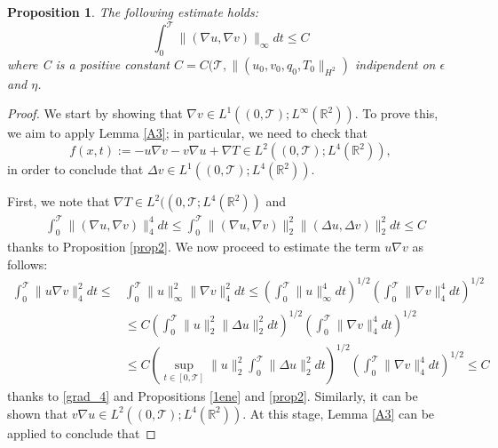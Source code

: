 \documentclass[11pt, a4paper, article,reqno,]{amsart}
\newtheorem{proposition}[theorem]{Proposition}
\theoremstyle{remark}
\numberwithin{equation}{section}
\begin{document}
\begin{proposition}\label{grad_infty}
     The following estimate holds:
    \begin{equation}\label{grad_inf}
        \int_0^\mathcal{T}\|(\nabla u, \nabla v)\|_\infty dt \leq C 
    \end{equation}
    where C is a positive constant $C= C(\mathcal{T},\|(u_0,v_0,q_0,T_{0}\|_{H^2})$ indipendent on $\epsilon$ and $\eta$.
\end{proposition}
\begin{proof}
    We start by showing that $\nabla v \in L^1((0,\mathcal{T}); L^\infty(\mathbb{R}^2))$. To prove this, we aim to apply Lemma \ref{A3}; in particular, we need to check that
\begin{equation*}
    f(x,t) := - u \nabla v - v \nabla u + \nabla T \in L^2((0,\mathcal{T}); L^4(\mathbb{R}^2)),
\end{equation*}
in order to conclude that $\Delta v \in L^1((0,\mathcal{T}); L^4(\mathbb{R}^2))$.

    First, we note that $\nabla T \in L^2((0,\mathcal{T}; L^4(\mathbb{R}^2))$ and 
    \begin{equation}\label{grad_4}
        \begin{aligned}
            & \int_0^\mathcal{T} \|(\nabla u,\nabla v)\|_4^4 dt \leq \int_0^\mathcal{T}\|(\nabla u, \nabla v)\|_2^2 \|(\Delta u, \Delta v)\|_2^2 dt \leq C
        \end{aligned}
    \end{equation}
    thanks to Proposition \ref{prop2}. We now proceed to estimate the term $u \nabla v$ as follows:
\begin{equation*}
\begin{aligned}
   \int_0^\mathcal{T}\|u \nabla v\|_4^2 dt \leq & \int_0^\mathcal{T}\|u\|_\infty^2 \|\nabla v\|_4^2 dt \leq \left( \int_0^\mathcal{T}\|u\|_\infty^4 dt\right)^{1/2} \left( \int_0^\mathcal{T}\|\nabla v\|_4^4 dt\right)^{1/2} \\
   & \leq C\left( \int_0^\mathcal{T}\|u\|_2^2 \|\Delta u\|_2^2 dt\right)^{1/2} \left( \int_0^\mathcal{T}\|\nabla v\|_4^4 dt\right)^{1/2} \\
   & \leq C \left( \sup_{t \in [0,\mathcal{T}]} \|u\|_2^2\int_0^\mathcal{T}\|\Delta u\|_2^2 dt\right)^{1/2} \left( \int_0^\mathcal{T}\|\nabla v\|_4^4 dt\right)^{1/2} \leq C
\end{aligned}
\end{equation*}
thanks to \eqref{grad_4} and Propositions \ref{1ene} and \ref{prop2}. Similarly, it can be shown that $v \nabla u \in L^2((0,\mathcal{T}); L^4(\mathbb{R}^2))$. At this stage, Lemma \ref{A3} can be applied to conclude that


\end{proof}
\end{document}
